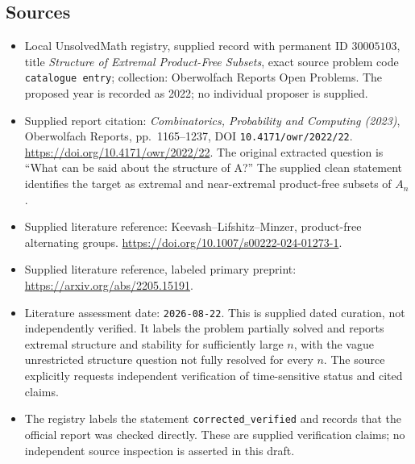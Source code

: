 \documentclass[11pt]{article}
\begin{document}
\subsection{Sources}
\begin{itemize}
\item Local UnsolvedMath registry, supplied record with permanent ID \(30005103\), title \emph{Structure of Extremal Product-Free Subsets}, exact source problem code \texttt{catalogue entry}; collection: Oberwolfach Reports Open Problems. The proposed year is recorded as 2022; no individual proposer is supplied.
\item Supplied report citation: \emph{Combinatorics, Probability and Computing (2023)}, Oberwolfach Reports, pp.\ 1165--1237, DOI \texttt{10.4171/owr/2022/22}. \url{https://doi.org/10.4171/owr/2022/22}. The original extracted question is ``What can be said about the structure of A?'' The supplied clean statement identifies the target as extremal and near-extremal product-free subsets of \(A_n\).
\item Supplied literature reference: Keevash--Lifshitz--Minzer, product-free alternating groups. \url{https://doi.org/10.1007/s00222-024-01273-1}.
\item Supplied literature reference, labeled primary preprint: \url{https://arxiv.org/abs/2205.15191}.
\item Literature assessment date: \texttt{2026-08-22}. This is supplied dated curation, not independently verified. It labels the problem partially solved and reports extremal structure and stability for sufficiently large \(n\), with the vague unrestricted structure question not fully resolved for every \(n\). The source explicitly requests independent verification of time-sensitive status and cited claims.
\item The registry labels the statement \texttt{corrected\_verified} and records that the official report was checked directly. These are supplied verification claims; no independent source inspection is asserted in this draft.
\end{itemize}
\end{document}
